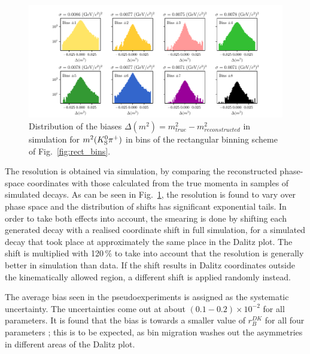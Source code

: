 
\begin{figure}[tb]
    \centering
    \includegraphics[width=\columnwidth]{figures/analysis/systematics/Dalitz_resolution_rect_bins.pdf}
    \caption{Distribution of the biases $\Delta (m^2) = m^2_{true} - m^2_{reconstructed}$ in simulation for $m^2({{K}^0_{\mathrm{S}}} {{\pi}^+})$ in bins of the rectangular binning scheme of Fig.~\ref{fig:rect_bins}.}
    \label{fig:dalitz_coord_resolution_and_correlation}
\end{figure}

The resolution is obtained via simulation, by comparing the reconstructed phase-space coordinates with those calculated from the true momenta in samples of simulated \DtoKspipi decays. As can be seen in Fig.~\ref{fig:dalitz_coord_resolution_and_correlation}, the resolution is found to vary over phase space and the distribution of shifts has significant exponential tails. In order to take both effects into account, the smearing is done by shifting each generated decay with a realised coordinate shift in full simulation, for a simulated decay that took place at approximately the same place in the Dalitz plot. The shift is multiplied with 120\,\% to take into account that the resolution is generally better in simulation than data. If the shift results in Dalitz coordinates outside the kinematically allowed region, a different shift is applied randomly instead.

The average bias seen in the pseudoexperiments is assigned as the systematic uncertainty. The uncertainties come out at about $(0.1-0.2)\times 10^{-2}$ for all parameters. It is found that the bias is towards a smaller value of $r_B^{DK}$ for all four \DK parameters ; this is to be expected, as bin migration washes out the asymmetries in different areas of the Dalitz plot. 






